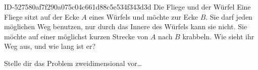 \begin{exercise}
      {ID-527580af7f290a075c04c661d88c5e534f343d3d}
      {Die Fliege und der Würfel}
  \ifproblem\problem
    Eine Fliege sitzt auf der Ecke $A$ eines Würfels und möchte zur Ecke $B$.
    Sie darf jeden möglichen Weg benutzen, nur durch das Innere des Würfels
    kann sie nicht. Sie möchte auf einer möglichst kurzen Strecke von $A$
    nach $B$ krabbeln. Wie sieht ihr Weg aus, und wie lang ist er?
    \begin{center}
    \end{center}
  \fi
  \ifoutline\outline
    Stelle dir das Problem zweidimensional vor\ldots
  \fi
\end{exercise}
